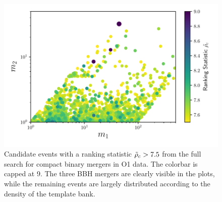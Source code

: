 \begin{figure}[]
  \centering
    \includegraphics[width=\columnwidth]{figs/chapter5/candidates.pdf}
\caption{Candidate events with a ranking statistic $\tilde{\rho}_c>7.5$ from the full search for compact binary mergers in O1 data. The colorbar is capped at 9. The three BBH mergers are clearly visible in the plots, while the remaining events are largely distributed according to the density 
of the template bank.}
\label{fig:bankcandidates}
\end{figure}


